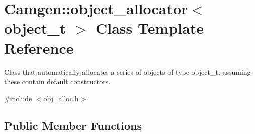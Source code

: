 \hypertarget{a00389}{}\section{Camgen\+:\+:object\+\_\+allocator$<$ object\+\_\+t $>$ Class Template Reference}
\label{a00389}


Class that automatically allocates a series of objects of type object\+\_\+t, assuming these contain default constructors.  




{\ttfamily \#include $<$obj\+\_\+alloc.\+h$>$}

\subsection*{Public Member Functions}
